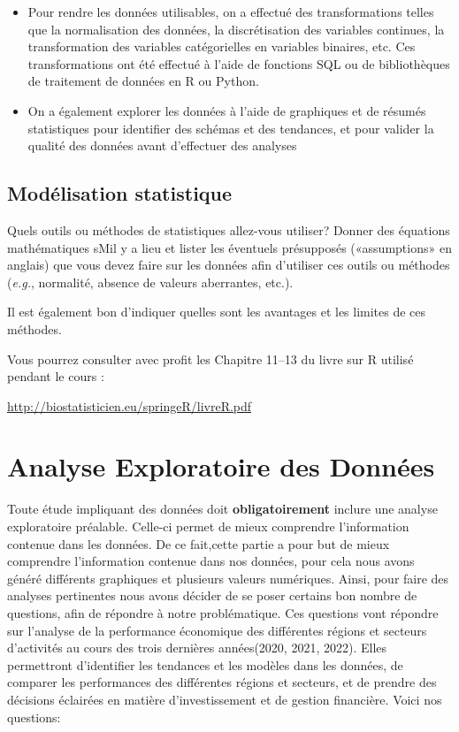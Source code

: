 \documentclass[mstat,12pt]{unswthesis}
\begin{document}
\begin{itemize}
\tightlist
\item
  Pour rendre les données utilisables, on a effectué des transformations
  telles que la normalisation des données, la discrétisation des
  variables continues, la transformation des variables catégorielles en
  variables binaires, etc. Ces transformations ont été effectué à l'aide
  de fonctions SQL ou de bibliothèques de traitement de données en R ou
  Python.
\item
  On a également explorer les données à l'aide de graphiques et de
  résumés statistiques pour identifier des schémas et des tendances, et
  pour valider la qualité des données avant d'effectuer des analyses
\end{itemize}

\hypertarget{moduxe9lisation-statistique}{%
\section{Modélisation statistique}\label{moduxe9lisation-statistique}}

Quels outils ou méthodes de statistiques allez-vous utiliser? Donner des
équations mathématiques sMil y a lieu et lister les éventuels
présupposés («assumptions» en anglais) que vous devez faire sur les
données afin d'utiliser ces outils ou méthodes (\emph{e.g.}, normalité,
absence de valeurs aberrantes, etc.).

Il est également bon d'indiquer quelles sont les avantages et les
limites de ces méthodes.

Vous pourrez consulter avec profit les Chapitre 11--13 du livre sur R
utilisé pendant le cours :

\url{http://biostatisticien.eu/springeR/livreR.pdf}

\hypertarget{analyse-exploratoire-des-donnuxe9es}{%
\chapter{Analyse Exploratoire des
Données}\label{analyse-exploratoire-des-donnuxe9es}}

Toute étude impliquant des données doit \textbf{obligatoirement} inclure
une analyse exploratoire préalable. Celle-ci permet de mieux comprendre
l'information contenue dans les données. De ce fait,cette partie a pour
but de mieux comprendre l'information contenue dans nos données, pour
cela nous avons généré différents graphiques et plusieurs valeurs
numériques. Ainsi, pour faire des analyses pertinentes nous avons
décider de se poser certains bon nombre de questions, afin de répondre à
notre problématique. Ces questions vont répondre sur l'analyse de la
performance économique des différentes régions et secteurs d'activités
au cours des trois dernières années(2020, 2021, 2022). Elles permettront
d'identifier les tendances et les modèles dans les données, de comparer
les performances des différentes régions et secteurs, et de prendre des
décisions éclairées en matière d'investissement et de gestion
financière. Voici nos questions:
\end{document}
